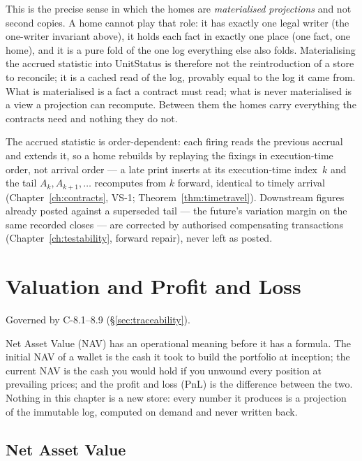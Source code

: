 \documentclass[11pt,a4paper]{article}
\begin{document}
This is the precise sense in which the homes are \emph{materialised projections} and not
second copies. A home cannot play that role: it has exactly one legal
writer (the one-writer invariant above), it holds each fact in exactly one place
(one fact, one home), and it is a pure fold of the one log everything else also
folds. Materialising the accrued statistic into UnitStatus is therefore not the
reintroduction of a store to reconcile; it is a cached read of the log, provably equal to
the log it came from. What is materialised is a fact a contract must read; what is never
materialised is a view a projection can recompute. Between them the homes carry everything
the contracts need and nothing they do not.

The accrued statistic is order-dependent: each firing reads the previous accrual and extends
it, so a home rebuilds by replaying the fixings in execution-time order, not arrival order ---
a late print inserts at its execution-time index~$k$ and the tail $A_{k},A_{k+1},\dots$
recomputes from $k$ forward, identical to timely arrival (Chapter~\ref{ch:contracts}, VS-1;
Theorem~\ref{thm:timetravel}). Downstream figures already posted against a superseded tail ---
the future's variation margin on the same recorded closes --- are corrected by authorised
compensating transactions (Chapter~\ref{ch:testability}, forward repair), never left as posted.

\section{Valuation and Profit and Loss}\label{ch:valuation}

Governed by C-8.1--8.9 (\S\ref{sec:traceability}).

Net Asset Value (NAV) has an operational meaning before it has a formula.
The initial NAV of a wallet is the cash it took to build the portfolio at
inception; the current NAV is the cash you would hold if you unwound every
position at prevailing prices; and the profit and loss (PnL) is the
difference between the two. Nothing in this chapter is a new store: every
number it produces is a projection of the immutable log, computed on demand
and never written back.

\subsection{Net Asset Value}
\end{document}
